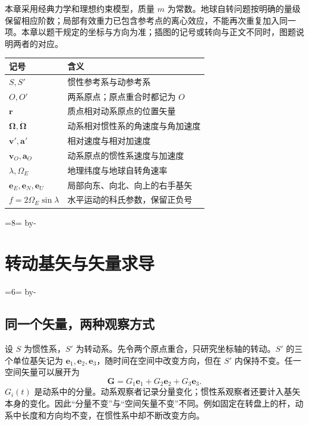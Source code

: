\documentclass[UTF8,zihao=-4,fontset=fandol,a4paper]{ctexart}
\makeatletter
\newcommand{\vect}[1]{\bm{#1}}
\newcommand{\Om}{\vect\Omega}
\newcommand{\Needspace}[1]{\par\if@nobreak\else\penalty0\begingroup\dimen0=#1\relax\dimen2=\pagegoal\advance\dimen2 by-\pagetotal\ifdim\dimen0>\dimen2\newpage\fi\endgroup\fi}
\let\SavedSection\section
\renewcommand{\section}{\Needspace{8\baselineskip}\SavedSection}
\let\SavedSubsection\subsection
\renewcommand{\subsection}{\Needspace{6\baselineskip}\SavedSubsection}
\makeatother
\begin{document}
本章采用经典力学和理想约束模型，质量 $m$ 为常数。地球自转问题按明确的量级保留相应阶数；局部有效重力已包含参考点的离心效应，不能再次重复加入同一项。本章以题干规定的坐标与方向为准；插图的记号或转向与正文不同时，图题说明两者的对应。
\begin{center}\small
\begin{tabularx}{\linewidth}{@{}lX@{}}\toprule
记号&含义\\\midrule
$S,S'$&惯性参考系与动参考系\\
$O,O'$&两系原点；原点重合时都记为 $O$\\
$\vect r$&质点相对动系原点的位置矢量\\
$\Om,\dot{\Om}$&动系相对惯性系的角速度与角加速度\\
$\vect v',\vect a'$&相对速度与相对加速度\\
$\vect v_O,\vect a_O$&动系原点的惯性系速度与加速度\\
$\lambda,\Omega_E$&地理纬度与地球自转角速率\\
$\vect e_E,\vect e_N,\vect e_U$&局部向东、向北、向上的右手基矢\\
$f=2\Omega_E\sin\lambda$&水平运动的科氏参数，保留正负号\\\bottomrule
\end{tabularx}\end{center}

\clearpage
\begingroup\small\linespread{1.05}\selectfont
\makeatletter
\renewcommand{\@pnumwidth}{2.2em}\renewcommand{\@tocrmarg}{3.2em}
\renewcommand*\l@section[2]{\addvspace{4pt}\@dottedtocline{1}{0em}{3.4em}{\bfseries #1}{\bfseries #2}}
\renewcommand*\l@subsection{\@dottedtocline{2}{1.5em}{4.2em}}
\makeatother
\tableofcontents\endgroup\clearpage
{}

\section{转动基矢与矢量求导}\label{sec:c4-1}\label{sec:transport}
\subsection{同一个矢量，两种观察方式}\label{sub:c4-1.1}
设 $S$ 为惯性系，$S'$ 为转动系。先令两个原点重合，只研究坐标轴的转动。$S'$ 的三个单位基矢记为 $\vect e_1,\vect e_2,\vect e_3$，随时间在空间中改变方向，但在 $S'$ 内保持不变。任一空间矢量可以展开为
\[
\vect G=G_1\vect e_1+G_2\vect e_2+G_3\vect e_3.
\]
$G_i(t)$ 是动系中的分量。动系观察者记录分量变化；惯性系观察者还要计入基矢本身的变化。因此“分量不变”与“空间矢量不变”不同。例如固定在转盘上的杆，动系中长度和方向均不变，在惯性系中却不断改变方向。
\end{document}
